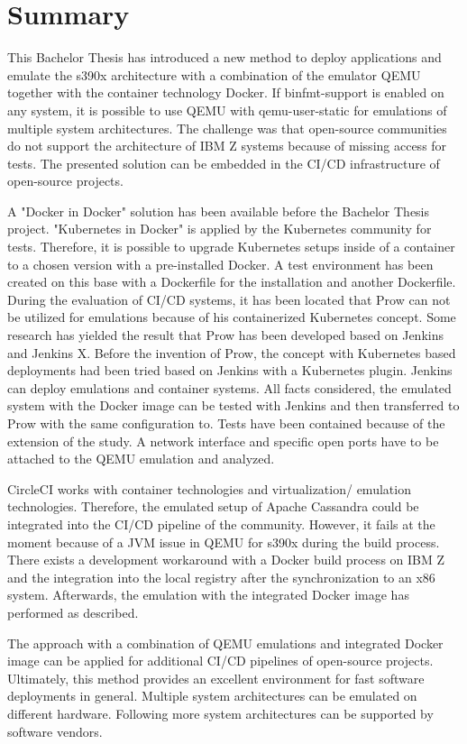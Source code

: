\chapter{Summary}\label{ch:summary}

This Bachelor Thesis has introduced a new method to deploy applications and emulate the s390x architecture with a combination of the emulator \gls{QEMU} together with the container technology Docker.
If binfmt-support is enabled on any system, it is possible to use \gls{QEMU} with qemu-user-static for emulations of multiple system architectures. 
The challenge was that open-source communities do not support the architecture of IBM Z systems because of missing access for tests. The presented solution can be embedded in the \gls{CI/CD} infrastructure of open-source projects. 

A "Docker in Docker" solution has been available before the Bachelor Thesis project. "Kubernetes in Docker" is applied by the Kubernetes community for tests. 
Therefore, it is possible to upgrade Kubernetes setups inside of a container to a chosen version with a pre-installed Docker. A test environment has been created on this base with a Dockerfile for the installation and another Dockerfile. During the evaluation of \gls{CI/CD} systems, it has been located that Prow can not be utilized for emulations because of his containerized Kubernetes concept. 
Some research has yielded the result that Prow has been developed based on Jenkins and Jenkins X. Before the invention of Prow, the concept with Kubernetes based deployments had been  tried based on Jenkins with a Kubernetes plugin. Jenkins can deploy emulations and container systems. 
All facts considered, the emulated system with the Docker image can be tested with Jenkins and then transferred to Prow with the same configuration to.
Tests have been contained because of the extension of the study. A network interface and specific open ports have to be attached to the \gls{QEMU} emulation and analyzed. 

CircleCI works with container technologies and virtualization/ emulation technologies. 
Therefore, the emulated setup of Apache Cassandra could be integrated into the \gls{CI/CD} pipeline of the community. However, it fails at the moment because of a JVM issue in \gls{QEMU} for s390x during the build process. 
There exists a development workaround with a Docker build process on IBM Z and the integration into the local registry after the synchronization to an x86 system. Afterwards, the emulation with the integrated Docker image has performed as described.

The approach with a combination of \gls{QEMU} emulations and integrated Docker image can be applied for additional \gls{CI/CD} pipelines of open-source projects. Ultimately, this method provides an excellent environment for fast software deployments in general. 
Multiple system architectures can be emulated on different hardware. Following more system architectures can be supported by software vendors.